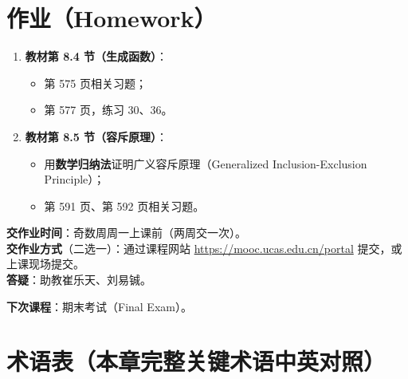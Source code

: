 \documentclass[UTF8,11pt,a4paper]{ctexbook}   %
\theoremstyle{definition}
\begin{document}
\section*{作业（Homework）}

\begin{enumerate}
    \item \textbf{教材第 8.4 节（生成函数）}：
    \begin{itemize}
        \item 第 575 页相关习题；
        \item 第 577 页，练习 30、36。
    \end{itemize}
    \item \textbf{教材第 8.5 节（容斥原理）}：
    \begin{itemize}
        \item 用\textbf{数学归纳法}证明广义容斥原理（Generalized Inclusion-Exclusion Principle）；
        \item 第 591 页、第 592 页相关习题。
    \end{itemize}
\end{enumerate}

\textbf{交作业时间}：奇数周周一上课前（两周交一次）。\\
\textbf{交作业方式}（二选一）：通过课程网站 \url{https://mooc.ucas.edu.cn/portal} 提交，或上课现场提交。\\
\textbf{答疑}：助教崔乐天、刘易铖。

\textbf{下次课程}：期末考试（Final Exam）。

\newpage
\section*{术语表（本章完整关键术语中英对照）}
\end{document}
